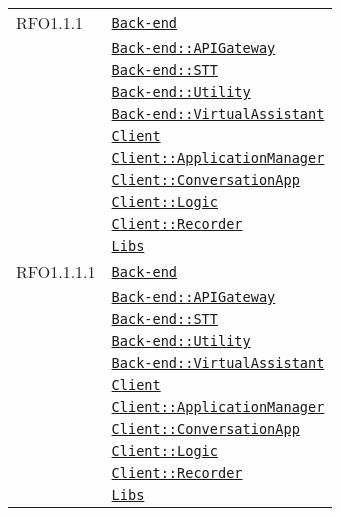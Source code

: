 \begin{longtable}{|>{\centering}m{3cm}|m{10cm}<{\centering}|}
RFO1.1.1 & \hyperref[Back-end]{\texttt{Back-end}}\\
& \hyperref[Back-end::APIGateway]{\texttt{Back-end::APIGateway}}\\
& \hyperref[Back-end::STT]{\texttt{Back-end::STT}}\\
& \hyperref[Back-end::Utility]{\texttt{Back-end::Utility}}\\
& \hyperref[Back-end::VirtualAssistant]{\texttt{Back-end::VirtualAssistant}}\\
& \hyperref[Client]{\texttt{Client}}\\
& \hyperref[Client::ApplicationManager]{\texttt{Client::ApplicationManager}}\\
& \hyperref[Client::ConversationApp]{\texttt{Client::ConversationApp}}\\
& \hyperref[Client::Logic]{\texttt{Client::Logic}}\\
& \hyperref[Client::Recorder]{\texttt{Client::Recorder}}\\
& \hyperref[Libs]{\texttt{Libs}}\\ \hline

RFO1.1.1.1 & \hyperref[Back-end]{\texttt{Back-end}}\\
& \hyperref[Back-end::APIGateway]{\texttt{Back-end::APIGateway}}\\
& \hyperref[Back-end::STT]{\texttt{Back-end::STT}}\\
& \hyperref[Back-end::Utility]{\texttt{Back-end::Utility}}\\
& \hyperref[Back-end::VirtualAssistant]{\texttt{Back-end::VirtualAssistant}}\\
& \hyperref[Client]{\texttt{Client}}\\
& \hyperref[Client::ApplicationManager]{\texttt{Client::ApplicationManager}}\\
& \hyperref[Client::ConversationApp]{\texttt{Client::ConversationApp}}\\
& \hyperref[Client::Logic]{\texttt{Client::Logic}}\\
& \hyperref[Client::Recorder]{\texttt{Client::Recorder}}\\
& \hyperref[Libs]{\texttt{Libs}}\\ \hline


\end{longtable}
